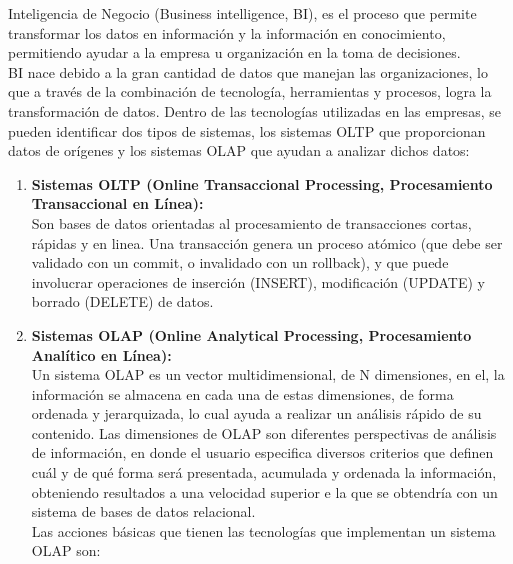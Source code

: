 Inteligencia de Negocio (Business intelligence, BI), es el proceso que permite transformar los datos en información y la información en conocimiento, permitiendo ayudar a la empresa u organización en la toma de decisiones.\cite{bi}\\

BI nace debido a la gran cantidad de datos que manejan las organizaciones, lo que a través de la combinación de tecnología, herramientas y procesos, logra la transformación de datos. Dentro de las tecnologías utilizadas en las empresas, se pueden identificar dos tipos de sistemas, los sistemas OLTP que proporcionan datos de orígenes y los sistemas OLAP que ayudan a analizar dichos datos: \cite{olapvsoltp}\\

\begin{enumerate}

    \item \textbf{Sistemas OLTP (Online Transaccional Processing, Procesamiento Transaccional en Línea):}\\
    Son bases de datos orientadas al procesamiento de transacciones cortas, rápidas y en linea. Una transacción genera un proceso atómico (que debe ser validado con un commit, o invalidado con un rollback), y que puede involucrar operaciones de inserción (INSERT), modificación (UPDATE) y borrado (DELETE) de datos.\\
    
    \item \textbf{Sistemas OLAP (Online Analytical Processing, Procesamiento Analítico en Línea):}\\
    Un sistema OLAP es un vector multidimensional, de N dimensiones, en el, la información se almacena en cada una de estas dimensiones, de forma ordenada y jerarquizada, lo cual ayuda a realizar un análisis rápido de su contenido. Las dimensiones de OLAP son diferentes perspectivas de análisis de información, en donde el usuario especifica diversos criterios que definen cuál y de qué forma será presentada, acumulada y ordenada la información, obteniendo resultados a una velocidad superior e la que se obtendría con un sistema de bases de datos relacional.\\
    
    Las acciones básicas que tienen las tecnologías que implementan un sistema OLAP son: \cite{bi}

\begin{itemize}
    

\end{itemize}
\end{enumerate}
